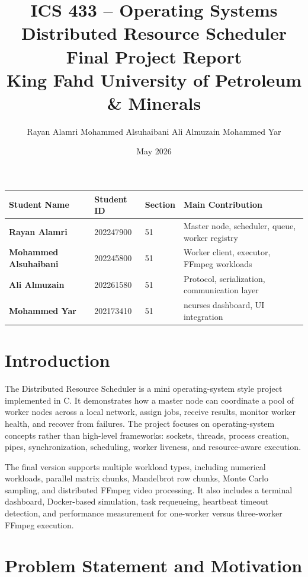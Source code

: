 \documentclass[12pt,a4paper]{article}
\title{
    \vspace{-0.5cm}
    \textbf{\large ICS 433 -- Operating Systems} \\[0.35cm]
    \textbf{\LARGE Distributed Resource Scheduler} \\[0.25cm]
    \large Final Project Report \\[0.25cm]
    \normalsize King Fahd University of Petroleum \& Minerals
}
\author{
    Rayan Alamri \quad
    Mohammed Alsuhaibani \quad
    Ali Almuzain \quad
    Mohammed Yar
}
\date{May 2026}
\begin{document}
\maketitle
\thispagestyle{fancy}

\begin{center}
\begin{tabular}{>{\bfseries}p{4.2cm}p{3.2cm}p{2.6cm}p{4.2cm}}
\toprule
Student Name & Student ID & Section & Main Contribution \\
\midrule
Rayan Alamri & 202247900 & 51 & Master node, scheduler, queue, worker registry \\
Mohammed Alsuhaibani & 202245800 & 51 & Worker client, executor, FFmpeg workloads \\
Ali Almuzain & 202261580 & 51 & Protocol, serialization, communication layer \\
Mohammed Yar & 202173410 & 51 & ncurses dashboard, UI integration \\
\bottomrule
\end{tabular}
\end{center}

\newpage
\tableofcontents
\newpage

\section{Introduction}

The Distributed Resource Scheduler is a mini operating-system style project implemented in C. It demonstrates how a master node can coordinate a pool of worker nodes across a local network, assign jobs, receive results, monitor worker health, and recover from failures. The project focuses on operating-system concepts rather than high-level frameworks: sockets, threads, process creation, pipes, synchronization, scheduling, worker liveness, and resource-aware execution.

The final version supports multiple workload types, including numerical workloads, parallel matrix chunks, Mandelbrot row chunks, Monte Carlo sampling, and distributed FFmpeg video processing. It also includes a terminal dashboard, Docker-based simulation, task requeueing, heartbeat timeout detection, and performance measurement for one-worker versus three-worker FFmpeg execution.

\section{Problem Statement and Motivation}
\end{document}
